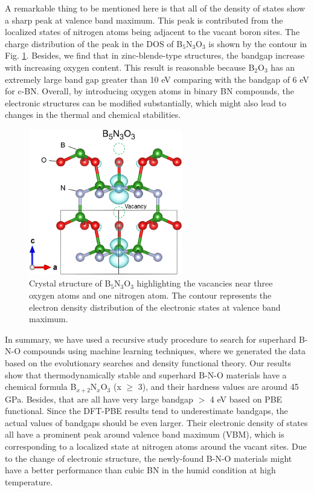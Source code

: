     A remarkable thing to be mentioned here is that all of the density of states show a sharp peak at valence band maximum. This peak is contributed from the localized states of nitrogen atoms being adjacent to the vacant boron sites. The charge distribution of the peak in the DOS of B$_5$N$_3$O$_3$ is shown by the contour in  Fig. \ref{BNO_5_vacancy}. Besides, we find that in zinc-blende-type structures, the bandgap increase with increasing oxygen content. This result is reasonable because B$_2$O$_3$ has an extremely large band gap greater than 10 eV \cite{B2O3_10eV} comparing with the bandgap of 6 eV for c-BN. Overall, by introducing oxygen atoms in binary BN compounds, the electronic structures can be modified substantially, which might also lead to changes in the thermal and chemical stabilities.
    
	\begin{figure}[htbp]
        \centering
        \captionsetup{singlelinecheck = false, justification=justified}
        \includegraphics[width=0.6\textwidth]{BNO_5_vacancy.png}
        \caption[Crystal structure of B$_5$N$_3$O$_3$ highlighting the vacancies and electron density distribution of the valence band maximum states]{Crystal structure of B$_5$N$_3$O$_3$ highlighting the vacancies near three oxygen atoms and one nitrogen atom. The contour represents the electron density distribution of the electronic states at valence band maximum.}
        \label{BNO_5_vacancy}
    \end{figure}
    \pagebreak

    In summary, we have used a recursive study procedure to search for superhard B-N-O compounds using machine learning techniques, where we generated the data based on the evolutionary searches and density functional theory. Our results show that thermodynamically stable and superhard B-N-O materials have a chemical formula B$_{x+2}$N$_{x}$O$_3$ (x $\ge$ 3), and their hardness values are around 45 GPa. Besides, that are all have very large bandgap $>$ 4 eV based on PBE functional. Since the DFT-PBE results tend to underestimate bandgaps, the actual values of bandgaps should be even larger. Their electronic density of states all have a prominent peak around valence band maximum (VBM), which is corresponding to a localized state at nitrogen atoms around the vacant sites. Due to the change of electronic structure, the newly-found B-N-O materials might have a better performance than cubic BN in the humid condition at high temperature. 


